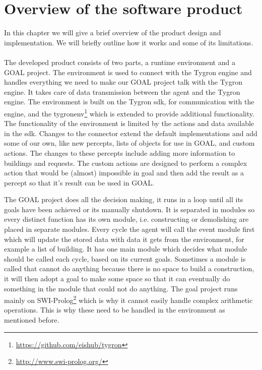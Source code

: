 \chapter{Overview of the software product}\label{ch:overview}
In this chapter we will give a brief overview of the product design and implementation. We will briefly outline how it works and some of its limitations.
\\
\\
The developed product consists of two parts, a runtime environment and a GOAL project.
The environment is used to connect with the Tygron engine and handles everything we need to make our GOAL project talk with the Tygron engine.
It takes care of data transmission between the agent and the Tygron engine.
The environment is built on the Tygron sdk, for communication with the engine, and the tygronenv\footnote{\url{https://github.com/eishub/tygron}} which is extended to provide additional functionality.
The functionality of the environment is limited by the actions and data available in the sdk.
Changes to the connector extend the default implementations and add some of our own, like new percepts, lists of objects for use in GOAL, and custom actions.
The changes to these percepts include adding more information to buildings and requests.
The custom actions are designed to perform a complex action that would be (almost) impossible in goal and then add the result as a percept so that it's result can be used in GOAL.

The GOAL project does all the decision making, it runs in a loop until all its goals have been achieved or its manually shutdown.
It is separated in modules so every distinct function has its own module, i.e. constructing or demolishing are placed in separate modules.
Every cycle the agent will call the event module first which will update the stored data with data it gets from the environment, for example a list of building.
It has one main module which decides what module should be called each cycle, based on its current goals.
Sometimes a module is called that cannot do anything because there is no space to build a construction, it will then adopt a goal to make some space so that it can eventually do something in the module that could not do anything.
The goal project runs mainly on SWI-Prolog\footnote{\url{http://www.swi-prolog.org/}} which is why it cannot easily handle complex arithmetic operations. 
This is why these need to be handled in the environment as mentioned before.

